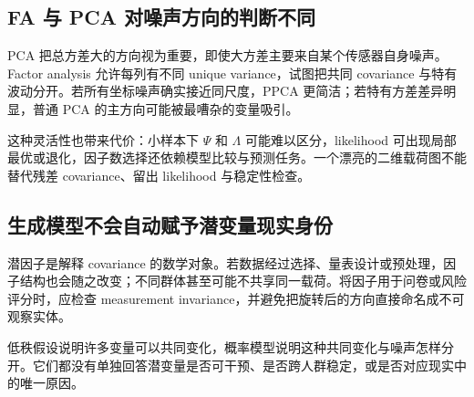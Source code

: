 \subsection{FA 与 PCA 对噪声方向的判断不同}

PCA 把总方差大的方向视为重要，即使大方差主要来自某个传感器自身噪声。Factor analysis 允许每列有不同 unique variance，试图把共同 covariance 与特有波动分开。若所有坐标噪声确实接近同尺度，PPCA 更简洁；若特有方差差异明显，普通 PCA 的主方向可能被最嘈杂的变量吸引。

这种灵活性也带来代价：小样本下 \(\Psi\) 和 \(\Lambda\) 可能难以区分，likelihood 可出现局部最优或退化，因子数选择还依赖模型比较与预测任务。一个漂亮的二维载荷图不能替代残差 covariance、留出 likelihood 与稳定性检查。

\subsection{生成模型不会自动赋予潜变量现实身份}

潜因子是解释 covariance 的数学对象。若数据经过选择、量表设计或预处理，因子结构也会随之改变；不同群体甚至可能不共享同一载荷。将因子用于问卷或风险评分时，应检查 measurement invariance，并避免把旋转后的方向直接命名成不可观察实体。

低秩假设说明许多变量可以共同变化，概率模型说明这种共同变化与噪声怎样分开。它们都没有单独回答潜变量是否可干预、是否跨人群稳定，或是否对应现实中的唯一原因。
